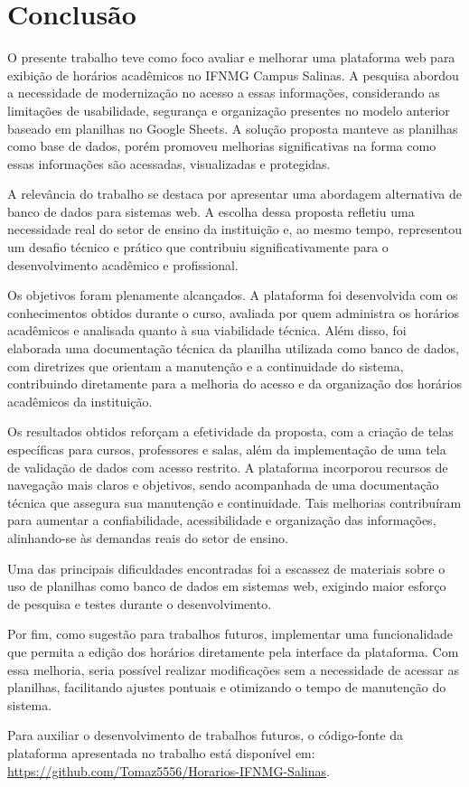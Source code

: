 \chapter{Conclusão} 
\label{cap6_conclusao} 

O presente trabalho teve como foco avaliar e melhorar uma plataforma web para exibição de horários acadêmicos no IFNMG Campus Salinas. A pesquisa abordou a necessidade de modernização no acesso a essas informações, considerando as limitações de usabilidade, segurança e organização presentes no modelo anterior baseado em planilhas no Google Sheets. A solução proposta manteve as planilhas como base de dados, porém promoveu melhorias significativas na forma como essas informações são acessadas, visualizadas e protegidas.

A relevância do trabalho se destaca por apresentar uma abordagem alternativa de banco de dados para sistemas web. A escolha dessa proposta refletiu uma necessidade real do setor de ensino da instituição e, ao mesmo tempo, representou um desafio técnico e prático que contribuiu significativamente para o desenvolvimento acadêmico e profissional.

Os objetivos foram plenamente alcançados. A plataforma foi desenvolvida com os conhecimentos obtidos durante o curso, avaliada por quem administra os horários acadêmicos e analisada quanto à sua viabilidade técnica. Além disso, foi elaborada uma documentação técnica da planilha utilizada como banco de dados, com diretrizes que orientam a manutenção e a continuidade do sistema, contribuindo diretamente para a melhoria do acesso e da organização dos horários acadêmicos da instituição.

Os resultados obtidos reforçam a efetividade da proposta, com a criação de telas específicas para cursos, professores e salas, além da implementação de uma tela de validação de dados com acesso restrito. A plataforma incorporou recursos de navegação mais claros e objetivos, sendo acompanhada de uma documentação técnica que assegura sua manutenção e continuidade. Tais melhorias contribuíram para aumentar a confiabilidade, acessibilidade e organização das informações, alinhando-se às demandas reais do setor de ensino.

Uma das principais dificuldades encontradas foi a escassez de materiais sobre o uso de planilhas como banco de dados em sistemas web, exigindo maior esforço de pesquisa e testes durante o desenvolvimento.

Por fim, como sugestão para trabalhos futuros, implementar uma funcionalidade que permita a edição dos horários diretamente pela interface da plataforma. Com essa melhoria, seria possível realizar modificações sem a necessidade de acessar as planilhas, facilitando ajustes pontuais e otimizando o tempo de manutenção do sistema.

Para auxiliar o desenvolvimento de trabalhos futuros, o código-fonte da plataforma apresentada no trabalho está disponível em: \url{https://github.com/Tomaz5556/Horarios-IFNMG-Salinas}.